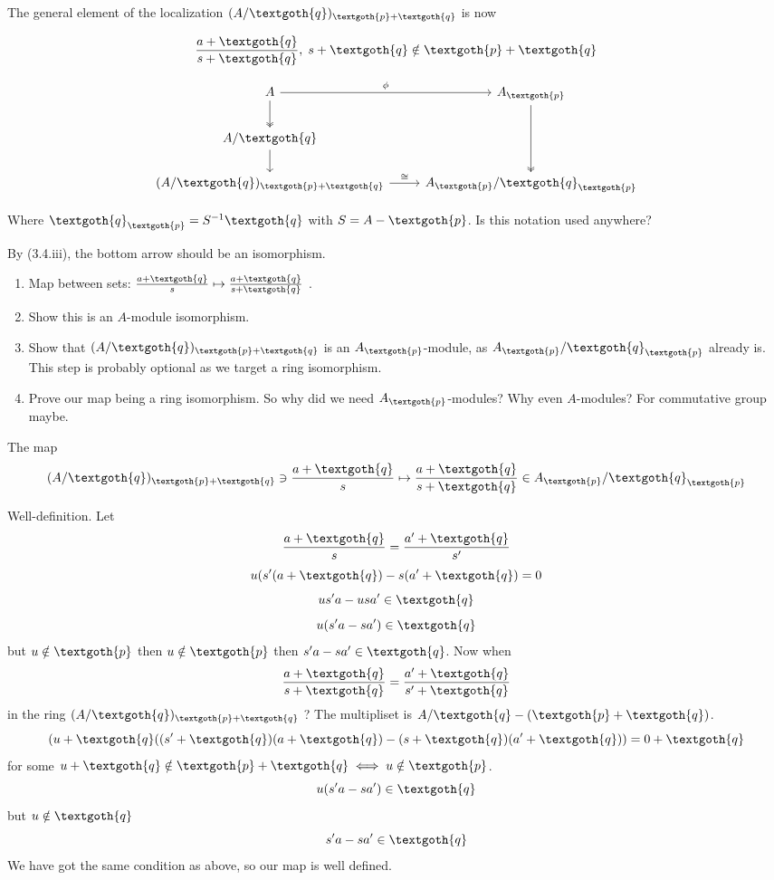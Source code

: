 \documentclass{article}
\begin{document}
The general element of the localization $(A/\textgoth{q})_{\textgoth{p} + \textgoth{q}}$ is now

\[
\frac{a + \textgoth{q}}{s + \textgoth{q}}, \; s + \textgoth{q} \notin \textgoth{p} + \textgoth{q}
\]

\[
  \begin{tikzcd}
     A \arrow[r, "\phi"] \arrow[d, two heads] & A_\textgoth{p} \arrow[dd, , two heads] \\
     A/\textgoth{q} \arrow[d] \\
     (A/\textgoth{q})_{\textgoth{p} + \textgoth{q}} \arrow[r, "\cong"] & A_\textgoth{p}/\textgoth{q}_\textgoth{p} 
  \end{tikzcd}
\]

\noindent
Where $\textgoth{q}_\textgoth{p} = S^{-1}\textgoth{q}$ with $S = A - \textgoth{p}$. Is this notation used anywhere?

By (3.4.iii), the bottom arrow should be an isomorphism. 
\begin{enumerate}
    \item Map between sets: $\frac{a + \textgoth{q}}{s} \mapsto \frac{a + \textgoth{q}}{s + \textgoth{q}}$  .
    \item Show this is an $A$-module isomorphism.
    \item Show that $(A/\textgoth{q})_{\textgoth{p}+\textgoth{q}}$ is an $A_\textgoth{p}$-module, as $A_\textgoth{p}/\textgoth{q}_\textgoth{p}$ already is. This step is probably optional as we target a ring isomorphism.
    \item Prove our map being a ring isomorphism. So why did we need $A_\textgoth{p}$-modules? Why even $A$-modules? For commutative group maybe.
\end{enumerate}

The map
\[
(A/\textgoth{q})_{\textgoth{p}+\textgoth{q}} \ni 
\frac{a + \textgoth{q}}{s} \mapsto \frac{a + \textgoth{q}}{s + \textgoth{q}} \in
A_\textgoth{p}/\textgoth{q}_\textgoth{p}
\]

Well-definition. Let
\[
\frac{a + \textgoth{q}}{s} = \frac{a' + \textgoth{q}}{s'} 
\]
\[
u(s'(a + \textgoth{q}) - s(a' + \textgoth{q}) = 0
\]
\[
us'a - usa' \in \textgoth{q}
\]
\[
u(s'a - sa') \in \textgoth{q}
\]
\noindent
but $u \notin \textgoth{p}$ then $u \notin \textgoth{p}$ then $s'a - sa' \in \textgoth{q}$. Now when
\[
\frac{a + \textgoth{q}}{s + \textgoth{q}} = \frac{a' + \textgoth{q}}{s' + \textgoth{q}}
\]
in the ring $(A/\textgoth{q})_{\textgoth{p}+\textgoth{q}}$ ? 
The multipliset is $A/\textgoth{q}-(\textgoth{p}+\textgoth{q})$.
\[
(u + \textgoth{q}((s' + \textgoth{q})(a + \textgoth{q}) - (s + \textgoth{q})(a' + \textgoth{q})) = 0 + \textgoth{q}
\]
\noindent
for some $u + \textgoth{q} \notin \textgoth{p} + \textgoth{q} \iff u \notin \textgoth{p}$.
\[
u(s'a - sa') \in \textgoth{q}
\]
\noindent
but $u \notin \textgoth{q}$
\[
s'a - sa' \in \textgoth{q}
\]
\noindent
We have got the same condition as above, so our map is well defined.
\end{document}
